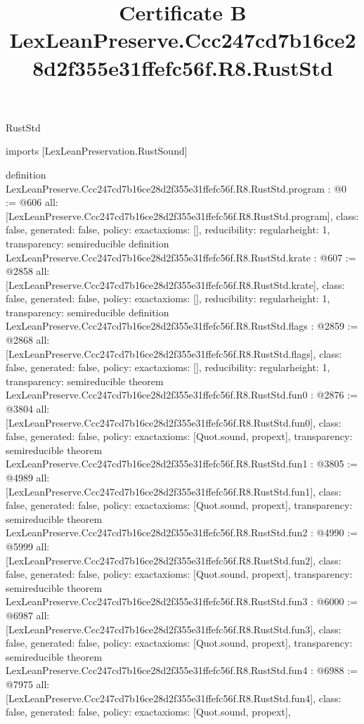 \begin{lexlean}{RustStd}
\title{Certificate B LexLeanPreserve.Ccc247cd7b16ce28d2f355e31ffefc56f.R8.RustStd}
\begin{coremodule}
imports [LexLeanPreservation.RustSound]

definition LexLeanPreserve.Ccc247cd7b16ce28d2f355e31ffefc56f.R8.RustStd.program : @0 := @606 {
  all: [LexLeanPreserve.Ccc247cd7b16ce28d2f355e31ffefc56f.R8.RustStd.program],
  class: false,
  generated: false,
  policy: exact{axioms: []},
  reducibility: regular{height: 1},
  transparency: semireducible
}
definition LexLeanPreserve.Ccc247cd7b16ce28d2f355e31ffefc56f.R8.RustStd.krate : @607 := @2858 {
  all: [LexLeanPreserve.Ccc247cd7b16ce28d2f355e31ffefc56f.R8.RustStd.krate],
  class: false,
  generated: false,
  policy: exact{axioms: []},
  reducibility: regular{height: 1},
  transparency: semireducible
}
definition LexLeanPreserve.Ccc247cd7b16ce28d2f355e31ffefc56f.R8.RustStd.flags : @2859 := @2868 {
  all: [LexLeanPreserve.Ccc247cd7b16ce28d2f355e31ffefc56f.R8.RustStd.flags],
  class: false,
  generated: false,
  policy: exact{axioms: []},
  reducibility: regular{height: 1},
  transparency: semireducible
}
theorem LexLeanPreserve.Ccc247cd7b16ce28d2f355e31ffefc56f.R8.RustStd.fun0 : @2876 := @3804 {
  all: [LexLeanPreserve.Ccc247cd7b16ce28d2f355e31ffefc56f.R8.RustStd.fun0],
  class: false,
  generated: false,
  policy: exact{axioms: [Quot.sound, propext]},
  transparency: semireducible
}
theorem LexLeanPreserve.Ccc247cd7b16ce28d2f355e31ffefc56f.R8.RustStd.fun1 : @3805 := @4989 {
  all: [LexLeanPreserve.Ccc247cd7b16ce28d2f355e31ffefc56f.R8.RustStd.fun1],
  class: false,
  generated: false,
  policy: exact{axioms: [Quot.sound, propext]},
  transparency: semireducible
}
theorem LexLeanPreserve.Ccc247cd7b16ce28d2f355e31ffefc56f.R8.RustStd.fun2 : @4990 := @5999 {
  all: [LexLeanPreserve.Ccc247cd7b16ce28d2f355e31ffefc56f.R8.RustStd.fun2],
  class: false,
  generated: false,
  policy: exact{axioms: [Quot.sound, propext]},
  transparency: semireducible
}
theorem LexLeanPreserve.Ccc247cd7b16ce28d2f355e31ffefc56f.R8.RustStd.fun3 : @6000 := @6987 {
  all: [LexLeanPreserve.Ccc247cd7b16ce28d2f355e31ffefc56f.R8.RustStd.fun3],
  class: false,
  generated: false,
  policy: exact{axioms: [Quot.sound, propext]},
  transparency: semireducible
}
theorem LexLeanPreserve.Ccc247cd7b16ce28d2f355e31ffefc56f.R8.RustStd.fun4 : @6988 := @7975 {
  all: [LexLeanPreserve.Ccc247cd7b16ce28d2f355e31ffefc56f.R8.RustStd.fun4],
  class: false,
  generated: false,
  policy: exact{axioms: [Quot.sound, propext]},
}
\end{coremodule}
\end{lexlean}
